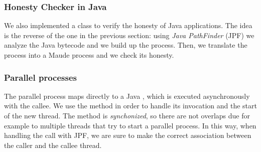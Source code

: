\subsubsection{Honesty Checker in Java}
We also implemented a class  to verify the
honesty of Java applications. The idea is the reverse of the one in
the previous section: using \textit{Java PathFinder} (JPF) we analyze
the Java bytecode and we build up the \coco process. Then, we
translate the \coco process into a Maude process and we check its honesty.


\subsubsection{Parallel processes}\label{sec:java-parallel}
The \coco parallel process maps directly to a Java
, which is executed asynchronously with the
callee. We use the method
 in order to handle its
invocation and the start of the new thread. The method is
\emph{synchonized}, so there are not overlaps due for example to
multiple threads that try to start a parallel process. In this way,
when handling the call with JPF, we are sure to make the correct
association between the caller and the callee thread.





